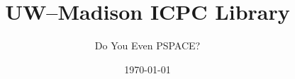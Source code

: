 \documentclass[10pt]{article}
\title{UW--Madison ICPC Library}
\date{\today}
\author{Do You Even PSPACE?}
\begin{document}
\inputminted{c++}{Algebra.cc.compiled}
\end{document}
